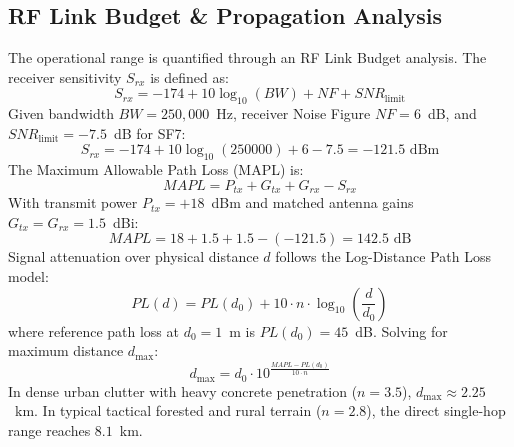\documentclass[conference]{IEEEtran}
\begin{document}
\subsection{RF Link Budget \& Propagation Analysis}
The operational range is quantified through an RF Link Budget analysis. The receiver sensitivity $S_{rx}$ is defined as:
\begin{equation}
S_{rx} = -174 + 10 \log_{10}(BW) + NF + SNR_{\text{limit}}
\label{eq:sensitivity}
\end{equation}
Given bandwidth $BW = 250,000$~Hz, receiver Noise Figure $NF = 6$~dB, and $SNR_{\text{limit}} = -7.5$~dB for SF7:
\begin{equation}
S_{rx} = -174 + 10 \log_{10}(250000) + 6 - 7.5 = -121.5\text{ dBm}
\end{equation}
The Maximum Allowable Path Loss (MAPL) is:
\begin{equation}
MAPL = P_{tx} + G_{tx} + G_{rx} - S_{rx}
\label{eq:mapl}
\end{equation}
With transmit power $P_{tx} = +18$~dBm and matched antenna gains $G_{tx} = G_{rx} = 1.5$~dBi:
\begin{equation}
MAPL = 18 + 1.5 + 1.5 - (-121.5) = 142.5\text{ dB}
\end{equation}
Signal attenuation over physical distance $d$ follows the Log-Distance Path Loss model:
\begin{equation}
PL(d) = PL(d_0) + 10 \cdot n \cdot \log_{10}\left(\frac{d}{d_0}\right)
\label{eq:pathloss}
\end{equation}
where reference path loss at $d_0 = 1$~m is $PL(d_0) = 45$~dB. Solving for maximum distance $d_{\text{max}}$:
\begin{equation}
d_{\text{max}} = d_0 \cdot 10^{\frac{MAPL - PL(d_0)}{10 \cdot n}}
\end{equation}
In dense urban clutter with heavy concrete penetration ($n = 3.5$), $d_{\text{max}} \approx 2.25$~km. In typical tactical forested and rural terrain ($n = 2.8$), the direct single-hop range reaches $8.1$~km.
\end{document}
